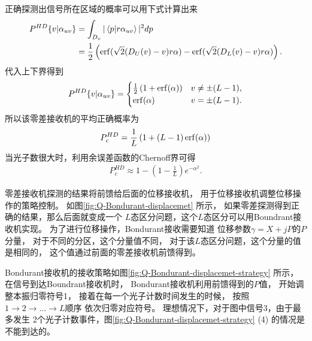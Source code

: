 正确探测出信号所在区域的概率可以用下式计算出来
\begin{equation}
\begin{split}
P^{HD}\{v|\alpha_{uv}\} &= \int_{D_v}|\bra{p}\ket{r\alpha_{uv}}|^2 dp  \\
   &= \frac{1}{2} \left( \erf(\sqrt{2} (D_U(v)-v) r\alpha) -  \erf(\sqrt{2} (D_L(v)-v) r\alpha) \right).
\end{split}
\end{equation}
代入上下界得到
\begin{equation}
\begin{split}
P^{HD}\{v|\alpha_{uv}\} = \begin{cases}
                            \frac{1}{2}\left( 1 + \erf(\alpha) \right)  & v \neq \pm (L-1), \\
                            \erf(\alpha) & v = \pm (L-1).
                          \end{cases}
\end{split}
\end{equation}
所以该零差接收机的平均正确概率为
\begin{equation}
P_c^{HD} = \frac{1}{L}\left(1 + (L-1)\erf(\alpha) \right)
\end{equation}
当光子数很大时，利用余误差函数的Chernoff界\cite{chang2011chernoff}可得
\begin{equation}
\begin{split}
P_c^{HD} \approx 1 - (1-\frac{1}{L}) e^{-\alpha^2}.
\end{split}
\label{eq:QAM-Hybrid-approx-1}
\end{equation}



零差接收机探测的结果将前馈给后面的位移接收机，
用于位移接收机调整位移操作的策略控制。
如图\ref{fig:Q-Bondurant-displacemet} 所示，
如果零差探测得到正确的结果，那么后面就变成一个
$L$态区分问题，这个$L$态区分可以用Boundrant接收机实现。
为了进行位移操作，Bondurant接收需要知道
位移参数$\gamma = X + jP$的$P$分量，
对于不同的分区，这个分量值不同，
对于该$L$态区分问题，这个分量的值是相同的，
这个值通过前面的零差接收机前馈得到。



Bondurant接收机的接收策略如图\ref{fig:Q-Bondurant-displacemet-strategy}  所示，
在信号到达Boundrant接收机时，
Bondurant接收机利用前馈得到的$P$值，
开始调整本振归零符号1，
接着在每一个光子计数时间发生的时候，
按照$1\rightarrow 2 \rightarrow ... \rightarrow L$顺序
依次归零对应符号。
理想情况下，对于图中信号3，由于最多发生
2个光子计数事件，图\ref{fig:Q-Bondurant-displacemet-strategy} (4)
的情况是不能到达的。

